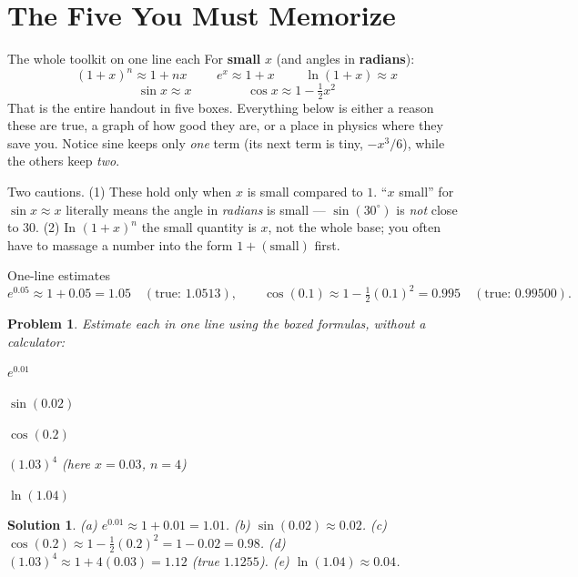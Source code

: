 \documentclass[11pt]{article}
\newcommand{\clearpts}{\addtocounter{tpts}{\value{cpts}} \setcounter{cpts}{0}}
\newcommand{\pts}[1]{\clearpts \setcounter{cpts}{#1}}
\newtheorem*{solution}{Solution}
\theoremstyle{mystyle}
\newtheorem{pproblem}{Problem}
\begin{document}
\section{The Five You Must Memorize}

\begin{psidea}{The whole toolkit on one line each}{}
For \textbf{small} $x$ (and angles in \textbf{radians}):
\[
\boxed{\,(1+x)^n \approx 1 + nx\,}\qquad
\boxed{\,e^{x} \approx 1 + x\,}\qquad
\boxed{\,\ln(1+x) \approx x\,}
\]
\[
\boxed{\,\sin x \approx x\,}\qquad\qquad
\boxed{\,\cos x \approx 1 - \tfrac{1}{2}x^2\,}
\]
That is the entire handout in five boxes. Everything below is either a reason these are
true, a graph of how good they are, or a place in physics where they save you. Notice
sine keeps only \emph{one} term (its next term is tiny, $-x^3/6$), while the others keep
\emph{two}.
\end{psidea}

\begin{psremark*}{}{}
Two cautions. (1) These hold only when $x$ is small compared to $1$. ``$x$ small'' for
$\sin x \approx x$ literally means the angle in \emph{radians} is small --- $\sin(30^\circ)$
is \emph{not} close to $30$. (2) In $(1+x)^n$ the small quantity is $x$, not the whole
base; you often have to massage a number into the form $1 + (\text{small})$ first.
\end{psremark*}

\begin{psexample}{One-line estimates}{}
\[
e^{0.05} \approx 1 + 0.05 = 1.05 \quad(\text{true: } 1.0513),\qquad
\cos(0.1) \approx 1 - \tfrac12(0.1)^2 = 0.995 \quad(\text{true: } 0.99500).
\]
\end{psexample}

\pts{5}
\begin{pproblem}
Estimate each in one line using the boxed formulas, without a calculator:
\begin{subpart}
\item $e^{0.01}$
\item $\sin(0.02)$
\item $\cos(0.2)$
\item $(1.03)^{4}$ \quad (here $x = 0.03$, $n = 4$)
\item $\ln(1.04)$
\end{subpart}
\end{pproblem}
\begin{solution}
(a) $e^{0.01}\approx 1+0.01 = 1.01$.\quad
(b) $\sin(0.02)\approx 0.02$.\quad
(c) $\cos(0.2)\approx 1-\tfrac12(0.2)^2 = 1-0.02 = 0.98$.\quad
(d) $(1.03)^4 \approx 1 + 4(0.03) = 1.12$ (true $1.1255$).\quad
(e) $\ln(1.04)\approx 0.04$.
\end{solution}
\end{document}
